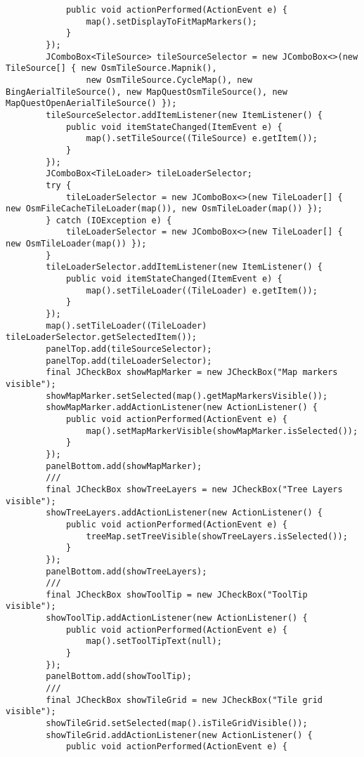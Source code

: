 \begin{verbatim}
            public void actionPerformed(ActionEvent e) {
                map().setDisplayToFitMapMarkers();
            }
        });
        JComboBox<TileSource> tileSourceSelector = new JComboBox<>(new TileSource[] { new OsmTileSource.Mapnik(),
                new OsmTileSource.CycleMap(), new BingAerialTileSource(), new MapQuestOsmTileSource(), new MapQuestOpenAerialTileSource() });
        tileSourceSelector.addItemListener(new ItemListener() {
            public void itemStateChanged(ItemEvent e) {
                map().setTileSource((TileSource) e.getItem());
            }
        });
        JComboBox<TileLoader> tileLoaderSelector;
        try {
            tileLoaderSelector = new JComboBox<>(new TileLoader[] { new OsmFileCacheTileLoader(map()), new OsmTileLoader(map()) });
        } catch (IOException e) {
            tileLoaderSelector = new JComboBox<>(new TileLoader[] { new OsmTileLoader(map()) });
        }
        tileLoaderSelector.addItemListener(new ItemListener() {
            public void itemStateChanged(ItemEvent e) {
                map().setTileLoader((TileLoader) e.getItem());
            }
        });
        map().setTileLoader((TileLoader) tileLoaderSelector.getSelectedItem());
        panelTop.add(tileSourceSelector);
        panelTop.add(tileLoaderSelector);
        final JCheckBox showMapMarker = new JCheckBox("Map markers visible");
        showMapMarker.setSelected(map().getMapMarkersVisible());
        showMapMarker.addActionListener(new ActionListener() {
            public void actionPerformed(ActionEvent e) {
                map().setMapMarkerVisible(showMapMarker.isSelected());
            }
        });
        panelBottom.add(showMapMarker);
        ///
        final JCheckBox showTreeLayers = new JCheckBox("Tree Layers visible");
        showTreeLayers.addActionListener(new ActionListener() {
            public void actionPerformed(ActionEvent e) {
                treeMap.setTreeVisible(showTreeLayers.isSelected());
            }
        });
        panelBottom.add(showTreeLayers);
        ///
        final JCheckBox showToolTip = new JCheckBox("ToolTip visible");
        showToolTip.addActionListener(new ActionListener() {
            public void actionPerformed(ActionEvent e) {
                map().setToolTipText(null);
            }
        });
        panelBottom.add(showToolTip);
        ///
        final JCheckBox showTileGrid = new JCheckBox("Tile grid visible");
        showTileGrid.setSelected(map().isTileGridVisible());
        showTileGrid.addActionListener(new ActionListener() {
            public void actionPerformed(ActionEvent e) {

\end{verbatim}
